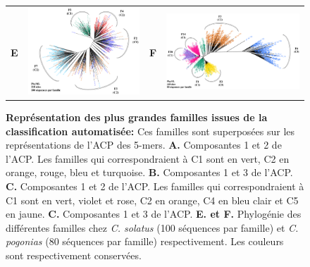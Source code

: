 \documentclass[12pt,a4paper]{article}
\begin{document}
\begin{figure}
\begin{tabular}{cc|cc}
		\textbf{E} & \includegraphics[scale=0.25]{img/tree_solatus.png} & \textbf{F} & \includegraphics[scale=0.21]{img/tree_pogonias.png} \\
	\end{tabular}
	\caption{\textbf{Représentation des plus grandes familles issues de la classification automatisée:} Ces familles sont superposées sur les représentations de l'ACP des 5-mers.
	\textbf{A.} Composantes 1 et 2 de l'ACP. Les familles qui correspondraient à C1 sont en vert, C2 en orange, rouge, bleu et turquoise.  \textbf{B.} Composantes 1 et 3 de l'ACP. 
	\textbf{C.} Composantes 1 et 2 de l'ACP. Les familles qui correspondraient à C1 sont en vert, violet et rose, C2 en orange, C4 en bleu clair et C5 en jaune.
	\textbf{C.} Composantes 1 et 3 de l'ACP.
	\textbf{E. et F.} Phylogénie des différentes familles chez \textit{C. solatus} (100 séquences par famille) et \textit{C. pogonias} (80 séquences par famille) respectivement. Les couleurs sont respectivement conservées.	 
	\label{fig:so_po_acp_tree}
		} 
\end{figure}
			
\end{document}
